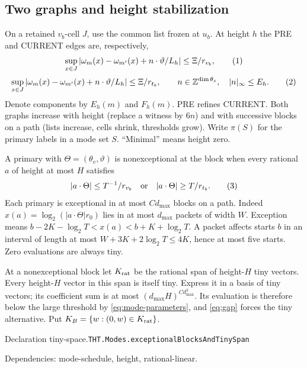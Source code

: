 \documentclass[11pt]{article}
\theoremstyle{definition}
\newcommand{\Z}{\mathbb Z}
\newcommand{\eqtag}[1]{\refstepcounter{equation}\tag{\theequation}\label{#1}}
\numberwithin{equation}{section}
\newcommand{\bp}[3]{\par\smallskip\begingroup\footnotesize
\noindent\hypertarget{bp:#1}{\textsf{Declaration #1.}}\quad\nolinkurl{#2}\par
\noindent\textsf{Dependencies:} #3.\par\endgroup\smallskip}
\begin{document}
\subsection{Two graphs and height stabilization}
On a retained $v_b$-cell $J$, use the common list frozen at $u_b$. At height $h$ the PRE and CURRENT edges are, respectively,
\[
 \sup_{x\in J}|\omega_m(x)-\omega_{m'}(x)+n\cdot\vartheta/L_h|\le\Xi/r_{v_b},
 \eqtag{eq:PRE}
\]
\[
 \sup_{x\in J}|\omega_m(x)-\omega_{m'}(x)+n\cdot\vartheta/L_h|\le\Xi/r_{t_b},
 \qquad n\in\Z^{\dim\theta_z},\quad |n|_\infty\le E_h.
 \eqtag{eq:CURRENT}
\]
Denote components by $E_h(m)$ and $F_h(m)$. PRE refines CURRENT. Both graphs increase with height (replace a witness by $6n$) and with successive blocks on a path (lists increase, cells shrink, thresholds grow). Write $\pi(S)$ for the primary labels in a mode set $S$. ``Minimal'' means height zero.

A primary with $\Theta=(\theta_v,\vartheta)$ is nonexceptional at the block when every rational $a$ of height at most $H$ satisfies
\[
 |a\cdot\Theta|\le T^{-1}/r_{v_b}\quad\text{or}\quad |a\cdot\Theta|\ge T/r_{t_b}.
 \eqtag{eq:gap}
\]
Each primary is exceptional in at most $Cd_{\max}$ blocks on a path. Indeed $x(a)=\log_2(|a\cdot\Theta|r_0)$ lies in at most $d_{\max}$ packets of width $W$. Exception means $b-2K-\log_2T<x(a)<b+K+\log_2T$. A packet affects starts $b$ in an interval of length at most $W+3K+2\log_2T\le4K$, hence at most five starts. Zero evaluations are always tiny.

At a nonexceptional block let $K_{\rm rat}$ be the rational span of height-$H$ tiny vectors. Every height-$H$ vector in this span is itself tiny. Express it in a basis of tiny vectors; its coefficient sum is at most $(d_{\max}H)^{Cd_{\max}^3}$. Its evaluation is therefore below the large threshold by \eqref{eq:mode-parameters}, and \eqref{eq:gap} forces the tiny alternative. Put $K_B=\{w:(0,w)\in K_{\rm rat}\}$.

\bp{tiny-space}{THT.Modes.exceptionalBlocksAndTinySpan}{mode-schedule, height, rational-linear}
\end{document}
